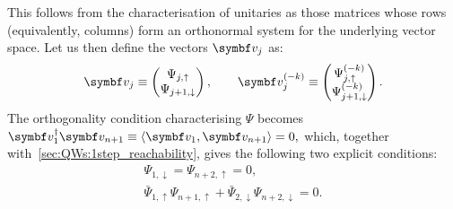 This follows from the characterisation of unitaries as those matrices whose rows (equivalently, columns) form an orthonormal system for the underlying vector space.
Let us then define the vectors $\bs v_j$ as:
\begin{equation}
    \bs v_j \equiv \begin{pmatrix}
        \Psi_{j,\uparrow} \\ \Psi_{j+1,\downarrow}
    \end{pmatrix},
    \qquad
    \bs v_j^{(-k)} \equiv \begin{pmatrix}
        \Psi^{(-k)}_{j,\uparrow} \\ \Psi^{(-k)}_{j+1,\downarrow}
    \end{pmatrix}.
\end{equation}
The orthogonality condition characterising $\Psi$ becomes
$
    \bs v_1^\dagger \bs v_{n+1} \equiv \langle \bs v_1, \bs v_{n+1}\rangle = 0,
$
which, together with~\cref{sec:QWs:1step_reachability}, gives the following two explicit conditions:
\begin{subequations}
    \label{eq:QWs:both_2ndstep_conditions}
    \begin{align}
        \Psi_{1,\downarrow} = \Psi_{n+2,\uparrow} = 0,
 		\label{eq:QWs:vanishing_endpoints_after_2steps}\\
        \bar\Psi_{1,\uparrow} \Psi_{n+1,\uparrow} + 
        \bar\Psi_{2,\downarrow} \Psi_{n+2,\downarrow} = 0.
 		\label{eq:QWs:1st_orthogonality_condition}
    \end{align}
\end{subequations}

